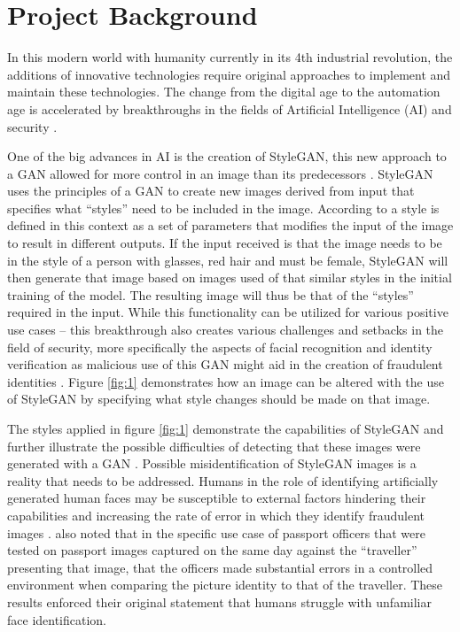 \section{Project Background}

In this modern world with humanity currently in its 4th industrial revolution, the additions of innovative technologies require original approaches to implement and maintain these technologies. The change from the digital age to the automation age is accelerated by breakthroughs in the fields of Artificial Intelligence (AI) and security \citep{Skilton2017}.

One of the big advances in AI is the creation of StyleGAN, this new approach to a GAN allowed for more control in an image than its predecessors \citep{Karras2019}. StyleGAN uses the principles of a GAN to create new images derived from input that specifies what “styles” need to be included in the image. According to \cite{Karras2019} a style is defined in this context as a set of parameters that modifies the input of the image to result in different outputs. If the input received is that the image needs to be in the style of a person with glasses, red hair and must be female, StyleGAN will then generate that image based on images used of that similar styles in the initial training of the model. The resulting image will thus be that of the “styles” required in the input. While this functionality can be utilized for various positive use cases – this breakthrough also creates various challenges and setbacks in the field of security, more specifically the aspects of facial recognition and identity verification as malicious use of this GAN might aid in the creation of fraudulent identities \citep{Mitra2021}. Figure \ref{fig:1} demonstrates how an image can be altered with the use of StyleGAN by specifying what style changes should be made on that image.

The styles applied in figure \ref{fig:1} demonstrate the capabilities of StyleGAN and further illustrate the possible difficulties of detecting that these images were generated with a GAN \citep{Karras2019}. Possible misidentification of StyleGAN images is a reality that needs to be addressed. Humans in the role of identifying artificially generated human faces may be susceptible to external factors hindering their capabilities and increasing the rate of error in which they identify fraudulent images \citep{Fysh2018}. \cite{Fysh2018} also noted that in the specific use case of passport officers that were tested on passport images captured on the same day against the “traveller” presenting that image, that the officers made substantial errors in a controlled environment when comparing the picture identity to that of the traveller. These results enforced their original statement that humans struggle with unfamiliar face identification.

